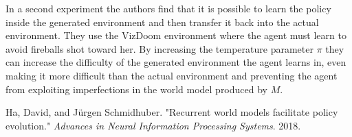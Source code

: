 \documentclass[12pt]{article}
\begin{document}
In a second experiment the authors find that it is possible to learn the policy inside the generated environment and then transfer it back into the actual environment. They use the VizDoom environment where the agent must learn to avoid fireballs shot toward her. By increasing the temperature parameter $\pi$ they can increase the difficulty of the generated environment the agent learns in, even making it more difficult than the actual environment and preventing the agent from exploiting imperfections in the world model produced by $M$. 


\begin{thebibliography}{9}
Ha, David, and Jürgen Schmidhuber. "Recurrent world models facilitate policy evolution." \emph{Advances in Neural Information Processing Systems}. 2018.

\end{thebibliography}
 
\end{document}
